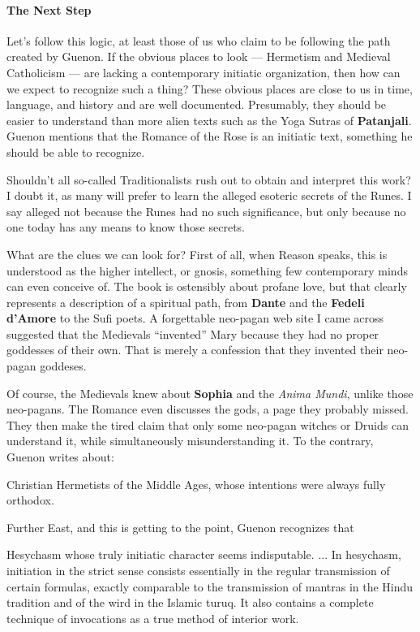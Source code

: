 \paragraph{The Next Step}


Let's follow this logic, at least those of us who claim to be following the path created by Guenon. If the obvious places to look --- Hermetism and Medieval Catholicism --- are lacking a contemporary initiatic organization, then how can we expect to recognize such a thing? These obvious places are close to us in time, language, and history and are well documented. Presumably, they should be easier to understand than more alien texts such as the Yoga Sutras of \textbf{Patanjali}. Guenon mentions that the Romance of the Rose is an initiatic text, something he should be able to recognize.

Shouldn't all so-called Traditionalists rush out to obtain and interpret this work? I doubt it, as many will prefer to learn the alleged esoteric secrets of the Runes. I say alleged not because the Runes had no such significance, but only because no one today has any means to know those secrets.

What are the clues we can look for? First of all, when Reason speaks, this is understood as the higher intellect, or gnosis, something few contemporary minds can even conceive of. The book is ostensibly about profane love, but that clearly represents a description of a spiritual path, from \textbf{Dante} and the \textbf{Fedeli d'Amore} to the Sufi poets. A forgettable neo-pagan web site I came across suggested that the Medievals ``invented'' Mary because they had no proper goddesses of their own. That is merely a confession that they invented their neo-pagan goddeses.

Of course, the Medievals knew about \textbf{Sophia} and the \emph{Anima Mundi}, unlike those neo-pagans. The Romance even discusses the gods, a page they probably missed. They then make the tired claim that only some neo-pagan witches or Druids can understand it, while simultaneously misunderstanding it. To the contrary, Guenon writes about:

\begin{quotex}
Christian Hermetists of the Middle Ages, whose intentions were always fully orthodox.
\end{quotex}


Further East, and this is getting to the point, Guenon recognizes that

\begin{quotex}
Hesychasm whose truly initiatic character seems indisputable. ... In hesychasm, initiation in the strict sense consists essentially in the regular transmission of certain formulas, exactly comparable to the transmission of mantras in the Hindu tradition and of the wird in the Islamic turuq. It also contains a complete technique of invocations as a true method of interior work.
\end{quotex}


